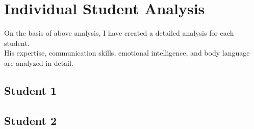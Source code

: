 \documentclass{article}
\begin{document}





\section{Individual Student Analysis}

On the basis of above analysis, I have created a detailed analysis for each student.\\
His expertise, communication skills, emotional intelligence, and body language are analyzed in detail.\\
\subsection{Student 1}



\subsection{Student 2}
\end{document}

